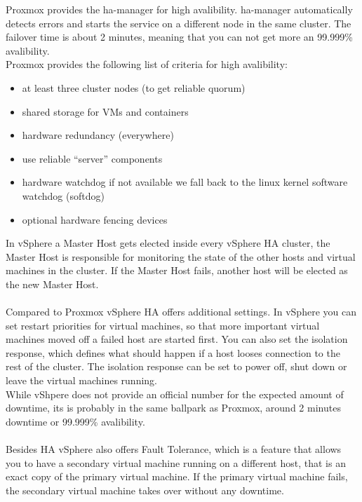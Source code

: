 Proxmox provides the ha-manager for high avalibility. ha-manager automatically detects errors and starts the service on a different node in the same cluster. The failover time is about 2 minutes, meaning that you can not get more an 99.999\% avalibility.
\\
Proxmox provides the following list of criteria for high avalibility:

\begin{itemize}
    \item at least three cluster nodes (to get reliable quorum)
    \item shared storage for VMs and containers
    \item hardware redundancy (everywhere)
    \item use reliable “server” components
    \item hardware watchdog \- if not available we fall back to the linux kernel software watchdog (softdog)
    \item optional hardware fencing devices
\end{itemize}

In vSphere a Master Host gets elected inside every vSphere HA cluster, the Master Host is responsible for monitoring the state of the other hosts and virtual machines in the cluster. If the Master Host fails, another host will be elected as the new Master Host.
\\\\
Compared to Proxmox vSphere HA offers additional settings. In vSphere you can set restart priorities for virtual machines, so that more important virtual machines moved off a failed host are started first. You can also set the isolation response, which defines what should happen if a host looses connection to the rest of the cluster. The isolation response can be set to power off, shut down or leave the virtual machines running.
\\
While vShpere does not provide an official number for the expected amount of downtime, its is probably in the same ballpark as Proxmox, around 2 minutes downtime or 99.999\% avalibility.
\\\\
Besides HA vSphere also offers Fault Tolerance, which is a feature that allows you to have a secondary virtual machine running on a different host, that is an exact copy of the primary virtual machine. If the primary virtual machine fails, the secondary virtual machine takes over without any downtime. 